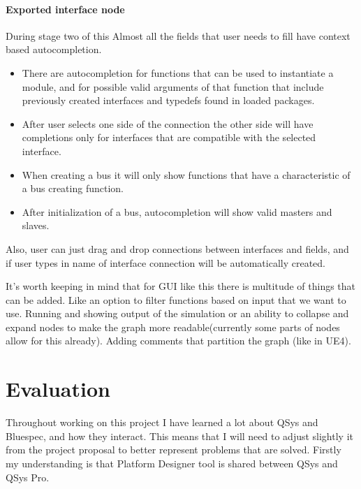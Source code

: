 \documentclass[12pt]{report}
\begin{document}
\subsubsection{Exported interface node}


\newpage
During stage two of this 
Almost all the fields that user needs to fill have context based autocompletion. 
\begin{itemize}
    \item There are autocompletion for functions that can be used to instantiate a module, and for possible valid arguments of that function that include previously created interfaces and typedefs found in loaded packages.
    \item After user selects one side of the connection the other side will have completions only for interfaces that are compatible with the selected interface. 
    \item When creating a bus it will only show functions that have a characteristic of a bus creating function.
    \item After initialization of a bus, autocompletion will show valid masters and slaves. 
\end{itemize}
Also, user can just drag and drop connections between interfaces and fields, and if user types in name of interface connection will be automatically created.

\begin{tcolorbox}[title=Futher work]
    It's worth keeping in mind that for GUI like this there is multitude of things that can be added. Like an option to filter functions based on input that we want to use. Running and showing output of the simulation or an ability to collapse and expand nodes to make the graph more readable(currently some parts of nodes allow for this already). Adding comments that partition the graph (like in UE4).
\end{tcolorbox}

\chapter{Evaluation}
Throughout working on this project I have learned a lot about QSys and Bluespec, and how they interact. This means that I will need to adjust slightly it from the project proposal to better represent problems that are solved. Firstly my understanding is that Platform Designer tool is shared between QSys and QSys Pro.
\end{document}
